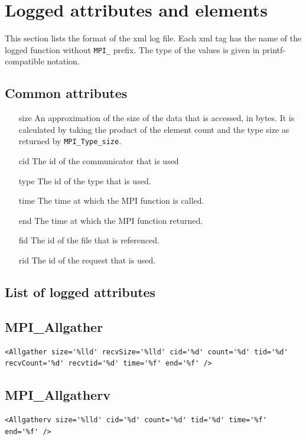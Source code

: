 \documentclass[a4paper,12pt,pdftex]{scrartcl}
\begin{document}
\appendix

\section{Logged attributes and elements}

This section lists the format of the xml log file. Each xml tag has
the name of the logged function without \verb/MPI_/ prefix. 
The type of the values is given in printf-compatible notation.

\subsection{Common attributes}

\begin{itemize}
\item[size] An approximation of the size of the data that is accessed,
  in bytes. It is calculated by taking the product of the element
  count and the type size as returned by \verb/MPI_Type_size/.
\item[cid] The id of the communicator that is used
\item[type] The id of the type that is used.
\item[time] The time at which the MPI function is called.
\item[end] The time at which the MPI function returned.
\item[fid] The id of the file that is referenced.
\item[rid] The id of the request that is used.
\end{itemize}

\subsection{List of logged attributes}


\subsection{MPI\_Allgather}
\begin{lstlisting}
<Allgather size='%lld' recvSize='%lld' cid='%d' count='%d' tid='%d' recvCount='%d' recvtid='%d' time='%f' end='%f' />
\end{lstlisting}

\subsection{MPI\_Allgatherv}
\begin{lstlisting}
<Allgatherv size='%lld' cid='%d' count='%d' tid='%d' time='%f' end='%f' />
\end{lstlisting}
\end{document}
